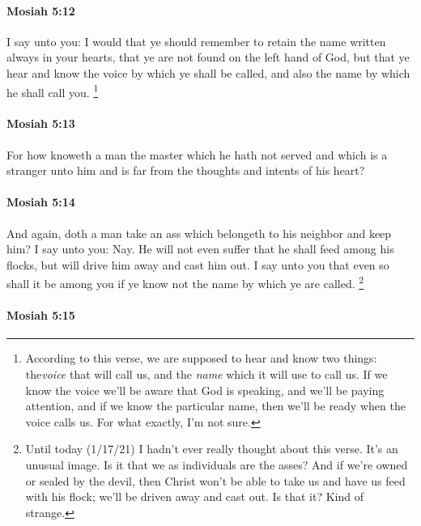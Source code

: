 		\paragraph{Mosiah 5:12} %
			\label{MOSIAH-5-12}

			I say unto you:
			I would that ye should remember
			to retain the name written
			always in your hearts,
			that ye are not found on the left hand of God,
			but that ye hear and know the voice by which ye shall be called,
			and also the name by which he shall call you.%
				\footnote{%
					According to this verse, we are supposed to hear and know two things: the\textit{voice} that will call us, and the \textit{name} which it will use to call us. If we know the voice we'll be aware that God is speaking, and we'll be paying attention, and if we know the particular name, then we'll be ready when the voice calls us. For what exactly, I'm not sure.
					}

		\paragraph{Mosiah 5:13} %
			\label{MOSIAH-5-13}

			For how knoweth a man the master which he hath not served
			and which is a stranger unto him
			and is far from the thoughts and intents of his heart?

		\paragraph{Mosiah 5:14} %
			\label{MOSIAH-5-14}

			And again, doth a man take an ass which belongeth to his neighbor and keep him?
			I say unto you: Nay.
			He will not even suffer that he shall feed among his flocks,
			but will drive him away and cast him out.
			I say unto you that even so shall it be among you
			if ye know not the name by which ye are called.%
				\footnote{%
					\label{MOSIAH-5-14-NOTE-flocks}%
					Until today (1/17/21) I hadn't ever really thought about this verse. It's an unusual image. Is it that we as individuals are the asses? And if we're owned or sealed by the devil, then Christ won't be able to take us and have us feed with his flock; we'll be driven away and cast out. Is that it? Kind of strange.
					}

		\paragraph{Mosiah 5:15} %
			\label{MOSIAH-5-15}

